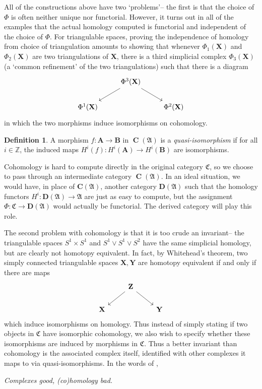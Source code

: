 \documentclass[a4paper]{article}
\theoremstyle{definition}
\newtheorem{defn}{Definition}[section]
\theoremstyle{remark}
\DeclareMathOperator{\Ch}{\mathbf{C}}
\begin{document}
All of the constructions above have two `problems'-- the first is that the
choice of \(\Phi\) is often neither unique nor functorial. However, it turns out
in all of the examples that the actual homology computed is functorial and
independent of the choice of \(\Phi\). For triangulable spaces, proving the
independence of homology from choice of triangulation amounts to showing that
whenever \(\Phi_1(\mathbf{X})\) and \(\Phi_2(\mathbf{X})\) are two
triangulations of \(\mathbf{X}\), there is a third simplicial complex
\(\Phi_3(\mathbf{X})\) (a `common refinement' of the two triangulations) such
that there is a diagram 
\[\begin{tikzcd}
    &\Phi^3(\mathbf{X})\arrow[dl] \arrow[dr]& \\
    \Phi^1(\mathbf{X}) & & \Phi^2(\mathbf{X})
\end{tikzcd}\]
in which the two morphisms induce isomorphisms on cohomology.
\begin{defn}
    A morphism \(f:\mathbf{A}\rightarrow \mathbf{B}\) in \(\Ch(\mathfrak{A})\)
    is a \textit{quasi-isomorphism} if for all \(i\in \mathbb{Z}\), the induced maps
    \(H^i(f): H^i(\mathbf{A})\rightarrow H^i(\mathbf{B})\) are isomorphisms.
\end{defn} 

Cohomology is hard to compute directly in the original category
\(\mathfrak{C}\), so we choose to pass through an intermediate category
\(\Ch(\mathfrak{A})\). In an ideal situation, we would have, in place of
\(\mathbf{C}(\mathfrak{A})\), another category \(\mathbf{D}(\mathfrak{A})\) such
that the homology functors \(H^i:\mathbf{D}(\mathfrak{A})\rightarrow \mathfrak{A}\)
are just as easy to compute, but the assignment \(\Phi: \mathfrak{C}\rightarrow
\mathbf{D}(\mathfrak{A})\) would actually be functorial. The derived category
will play this role.

The second problem with cohomology is that it is too crude an invariant-- the
triangulable spaces \(S^1\times S^1\) and \(S^1\vee S^1 \vee S^2\) have the
same simplicial homology, but are clearly not homotopy equivalent. In fact, by
Whitehead's theorem, two simply connected triangulable spaces
\(\mathbf{X},\mathbf{Y}\) are homotopy
equivalent if and only if there are maps 
\[\begin{tikzcd}
    &\mathbf{Z}\arrow[dl]\arrow[dr] &\\
    \mathbf{X} & & \mathbf{Y}
\end{tikzcd}\] 
which induce isomorphisms on homology. Thus instead of simply stating if two
objects in \(\mathfrak{C}\) have isomorphic cohomology, we also wish to specify
whether these isomorphisms are induced by morphisms in \(\mathfrak{C}\). Thus a
better invariant than cohomology is the associated complex itself, identified
with other complexes it maps to via quasi-isomorphisms. In the words of
, 
\begin{center}
    \textit{Complexes good, (co)homology bad.}
\end{center}
\pagebreak
\end{document}
